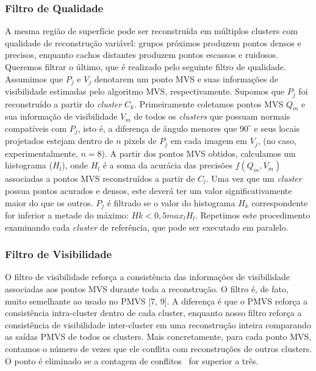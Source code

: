 \begin{itemize}
\subsubsection{Filtro de Qualidade}

A mesma região de superfície pode ser reconstruída em múltiplos clusters com qualidade de reconstrução variável: grupos próximos produzem pontos densos e precisos, enquanto cachos distantes produzem pontos escassos e ruidosos. Queremos filtrar o último, que é realizado pelo seguinte filtro de qualidade. Assumimos que $P_j$ e $V_j$ denotarem um ponto MVS e suas informações de visibilidade estimadas pelo algoritmo MVS, respectivamente. Supomos que $P_j$ foi reconstruído a partir do \emph{cluster} $C_k$. Primeiramente coletamos pontos MVS ${Q_m}$ e sua informação de visibilidade ${V_m}$ de todos os \emph{clusters} que possuam normais compatíveis com $P_j$, isto é, a diferença de ângulo menores que $90^\circ$ e seus locais projetados estejam dentro de $n$ pixels de $P_j$ em cada imagem em $V_j$, (no caso, experimentalmente, $n=8$). A partir dos pontos MVS obtidos, calculamos um histograma ($H_l$), onde $H_l$ é a soma da acurácia das precisões $f(Q_m,V_m)$ associadas a pontos MVS reconstruídos a partir de $C_l$. Uma vez que um \emph{cluster} possua pontos acurados e densos, este deverá ter um valor significativamente maior do que os outros. $P_j$ é filtrado se o valor do histograma $H_k$ correspondente for inferior a metade do máximo: $Hk < 0,5 max_l H_l$. Repetimos este procedimento examinando cada \emph{cluster} de referência, que pode ser executado em paralelo. 

\subsubsection{Filtro de Visibilidade}

O filtro de visibilidade reforça a consistência das informações de visibilidade associadas aos pontos MVS durante toda a reconstrução. O filtro é, de fato, muito semelhante ao usado no PMVS [7, 9]. A diferença é que o PMVS reforça a consistência intra-cluster dentro de cada cluster, enquanto nosso filtro reforça a consistência de visibilidade inter-cluster em uma reconstrução inteira comparando as saídas PMVS de todos os clusters. Mais concretamente, para cada ponto MVS, contamos o número de vezes que ele conflita com reconstruções de outros clusters. O ponto é eliminado se a contagem de conflitos~\cite{furukawa2010towards,furukawa2010accurate} for superior a três.

\end{itemize}

